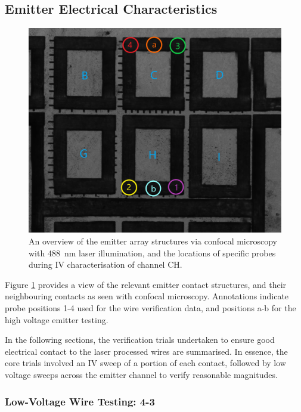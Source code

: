 \begin{refsection}
\section{Emitter Electrical Characteristics}

\begin{figure}[H]
    \centering
    \includegraphics[width=\linewidth]{Chapter7/Figs/Raster/emitter_probes_esid.jpg}
    \caption{An overview of the emitter array structures via confocal microscopy with 488~\si{\nano\metre} laser illumination, and the locations of specific probes during IV characterisation of channel CH.}
    \label{fig:emitter_esid_anno}
\end{figure}

Figure \ref{fig:emitter_esid_anno} provides a view of the relevant emitter contact structures, and their neighbouring contacts as seen with confocal microscopy. Annotations indicate probe positions 1-4 used for the wire verification data, and positions a-b for the high voltage emitter testing.

In the following sections, the verification trials undertaken to ensure good electrical contact to the laser processed wires are summarised. In essence, the core trials involved an IV sweep of a portion of each contact, followed by low voltage sweeps across the emitter channel to verify reasonable magnitudes. 

\subsubsection{Low-Voltage Wire Testing: 4-3}


\end{refsection}
